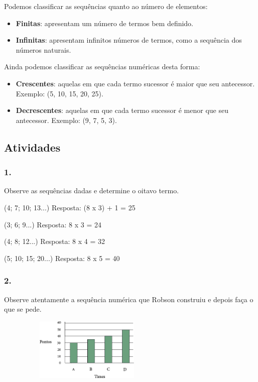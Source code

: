 \begin{enumerate}
\begin{escolha}
Podemos classificar as sequências quanto ao número de elementos:

\begin{itemize}
\item
  \textbf{Finitas}: apresentam um número de termos bem definido.
\item
  \textbf{Infinitas}: apresentam infinitos números de termos, como
  a sequência dos números naturais.
\end{itemize}

Ainda podemos classificar as sequências numéricas desta forma:

\begin{itemize}
\item
  \textbf{Crescentes}: aquelas em que cada termo sucessor é maior que seu
  antecessor. Exemplo: (5, 10, 15, 20, 25).
\item
  \textbf{Decrescentes}: aquelas em que cada termo sucessor é menor que
  seu antecessor. Exemplo: (9, 7, 5, 3).
\end{itemize}

\subsection{Atividades}\label{atividades-2}

\subsubsection{1.}\label{section-26}

Observe as sequências dadas e determine o oitavo termo.

\begin{escolha}
  \item (4; 7; 10; 13...)
Resposta: (8 x 3) + 1 = 25
  \item (3; 6; 9...)
Resposta: 8 x 3 = 24
  \item (4; 8; 12...)
Resposta: 8 x 4 = 32
  \item (5; 10; 15; 20...)
Resposta: 8 x 5 = 40
\end{escolha}

\subsubsection{2.}\label{section-27}

Observe atentamente a sequência numérica que Robson construiu e depois
faça o que se pede.

\includegraphics[width=3.44197in,height=1.18344in]{media/image43.png}


\end{escolha}
\end{enumerate}
